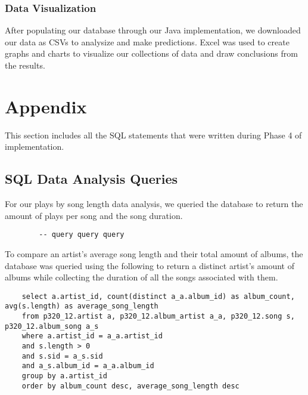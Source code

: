 \documentclass[12pt]{article}
\begin{document}
    \subsubsection{Data Visualization}
    After populating our database through our Java implementation, we downloaded our data as CSVs to
    analysize and make predictions. Excel was used to create graphs and charts to visualize our
    collections of data and draw conclusions from the results.

    \section{Appendix}

    This section includes all the SQL statements that were written during Phase 4 of
    implementation.

    \subsection{SQL Data Analysis Queries}


    \noindent For our plays by song length data analysis, we queried the
    database to return the amount of plays per song and the song duration.

    \begin{lstlisting}
        -- query query query
    \end{lstlisting}

    \noindent To compare an artist's average song length and their total amount
    of albums, the database was queried using the following to return
    a distinct artist's amount of albums while collecting the duration of all
    the songs associated with them.
    
    \begin{lstlisting}
    select a.artist_id, count(distinct a_a.album_id) as album_count, avg(s.length) as average_song_length
    from p320_12.artist a, p320_12.album_artist a_a, p320_12.song s, p320_12.album_song a_s
    where a.artist_id = a_a.artist_id
    and s.length > 0
    and s.sid = a_s.sid
    and a_s.album_id = a_a.album_id
    group by a.artist_id
    order by album_count desc, average_song_length desc

    \end{lstlisting}
\end{document}
